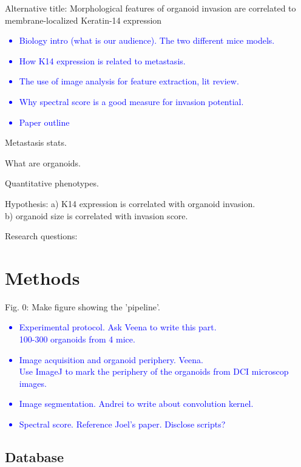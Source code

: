 \documentclass[runningheads]{llncs}
\begin{document}
Alternative title: Morphological features of organoid invasion are correlated to membrane-localized Keratin-14 expression

\textcolor{blue}{
\begin{itemize}
    \item Biology intro (what is our audience). The two different mice models.
    \item How K14 expression is related to metastasis.
    \item The use of image analysis for feature extraction, lit review.
    \item Why spectral score is a good measure for invasion potential.
    \item Paper outline
\end{itemize}
}

Metastasis stats.

What are organoids.

Quantitative phenotypes.


Hypothesis: a) K14 expression is correlated with organoid invasion.\\
b) organoid size is correlated with invasion score.

Research questions:


\section {Methods}

Fig. 0: Make figure showing the 'pipeline'.

\textcolor{blue}{
\begin{itemize}
    \item Experimental protocol. Ask Veena to write this part.\\ 
        100-300 organoids from 4 mice.
    \item Image acquisition and organoid periphery. Veena.\\
        Use ImageJ to mark the periphery of the organoids from DCI microscop images.
    \item Image segmentation. Andrei to write about convolution kernel.
    \item Spectral score. Reference Joel's paper. Disclose scripts?
\end{itemize}
}

\subsection{Database}
\end{document}
